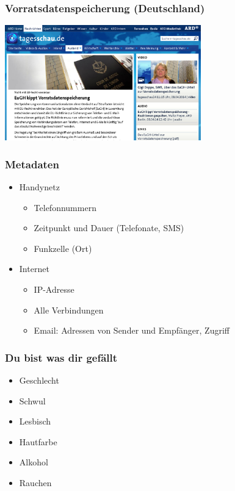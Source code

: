 \documentclass[12pt]{beamer}
\begin{document}
\begin{frame}
  \frametitle{Vorratsdatenspeicherung (Deutschland)}
    \begin{center}
      \includegraphics[height=5cm]{img/tagesschau-vds.png}
    \end{center}
\end{frame}

\begin{frame}
  \frametitle{Metadaten}
  \begin{itemize}
    \item Handynetz
      \begin{itemize}
        \item Telefonnummern
        \item Zeitpunkt und Dauer (Telefonate, SMS)
        \item Funkzelle (Ort)
      \end{itemize}
    \item Internet
      \begin{itemize}
        \item IP-Adresse
        \item Alle Verbindungen
        \item Email: Adressen von Sender und Empfänger, Zugriff
      \end{itemize}
  \end{itemize}
\end{frame}

\begin{frame}
  \frametitle{Du bist was dir gefällt}
  \begin{itemize}
    \item Geschlecht \textbf{}
    \item Schwul \textbf{}
    \item Lesbisch \textbf{}
    \item Hautfarbe \textbf{}
    \item Alkohol \textbf{}
    \item Rauchen \textbf{}
  \end{itemize}
\end{frame}
\end{document}

